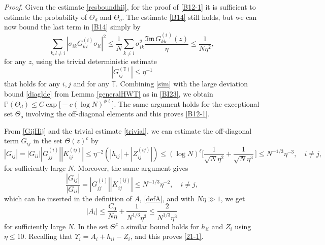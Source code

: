 \documentclass[draft]{article}
\newcommand{\be}{\begin{equation}}
\newcommand{\ee}{\end{equation}}
\newcommand{\im}{{\mathfrak{Im} \, }}
\renewcommand{\P}{{\mathbb P}}
\newcommand{\T}{\mathbb T}
\numberwithin{equation}{section}
\numberwithin{theorem}{section}
\numberwithin{definition}{section}
\numberwithin{remark}{section}
\begin{document}
  
{\it Proof.}  Given the estimate \eqref{resboundhij}, 
for the proof of \eqref{B12-1} 
 it is sufficient to estimate the probability of
$\Theta_d$ and $\Theta_o$. The estimate  \eqref{B14} still holds, but
  we can now  bound the last term in  \eqref{B14} simply  by 
\be\label{sim}
\sum_{k, l\not= i }\left|\sigma_{ik}
G^{(i)}_{k\,l}\sigma_{li}\right|^2\le
\frac1N \sum_{k\not= i } \sigma_{ik}^2 \frac{\im G^{(i\,)}_{kk}(z)}{\eta} 
\le \frac 1 { N \eta^2}, 
\ee
for  any  $z$,  using the trivial  deterministic estimate 
\be\label{trivial}
|G_{ij}^{(\T)}| \le  \eta^{-1} 
\ee
that holds for any $i,j$ and for any  $\T$.
Combining \eqref{sim} with
the large deviation bound \eqref{diaglde} from 
Lemma \ref{generalHWT} as in 
\eqref{BI23}, we obtain $\P (\Theta_d)\le C\exp{\big[-c(\log N)^{\phi \ell} \big]}.$
The same argument  holds for the exceptional set $\Theta_o$
involving the off-diagonal elements and this proves \eqref{B12-1}. 



From \eqref{GijHij} and the trivial estimate \eqref{trivial},
we can estimate  the off-diagonal term $G_{ij}$ in 
 the set $  \Theta(z) ^c$ by 
\be\label{6.4-1}
  |G_{ij}|  = |G_{ii}| |G_{jj}^{(i)}| |K_{ij}^{(ij)}|
  \le \eta^{-2} \left(|h_{ij}| + |Z_{ij}^{(ij)}|\right)
 \le  (\log N)^\ell  \bigg [ \frac 1 { \sqrt N \eta^2}  +  
 \frac {1 } {\sqrt{N} \eta^3}  \,  \bigg ] 
\le   N^{-1/3}  \eta^{-3}   , \quad i\ne j,
\ee
for sufficiently large $N$.
Moreover, the same argument gives
$$
   \frac{|G_{ij}|}{|G_{ii}|} =  |G_{jj}^{(i)}| |K_{ij}^{(ij)}|\le
 N^{-1/3}\eta^{-2},  \quad i\ne j,
$$
which can be inserted in the definition of $A$, \eqref{defA}, and with $N\eta\gg 1$,
we get
$$
  |A_i| \le \frac{C_0}{N\eta}  + \frac{1}{ N^{1/3}\eta^3} \le\frac{2}{ N^{1/3}\eta^3}
$$
 for sufficiently large $N$.
In the set $\Theta^c$
a similar bound holds for $h_{ii}$ and $Z_i$ using $\eta\le 10$.
Recalling that $\Upsilon_i = A_i + h_{ii} - Z_i$, 
 and this proves  \eqref{21-1}.
\end{document}
